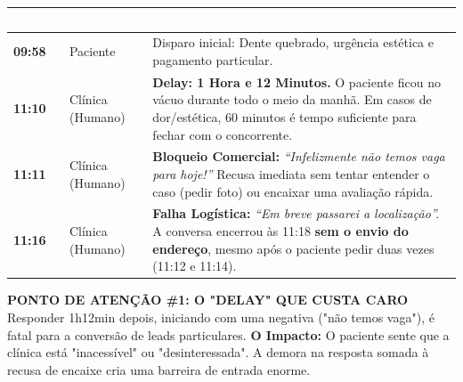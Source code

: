\documentclass[a4paper,11pt]{article}
\begin{document}
\begin{tcolorbox}[enhanced, frame hidden, colback=white]
    \renewcommand{\arraystretch}{1.5}
    \begin{tabular}{ | p{} | p{} | p{} | }
        \hline
        \rowcolor{infoDentalTeal}
        \textbf{\textcolor{white}{HORA}} & \textbf{\textcolor{white}{AGENTE}} & \textbf{\textcolor{white}{ANÁLISE DE FLUXO E TEMPO}} \\
        \hline
        \textbf{09:58} & Paciente &
        \small Disparo inicial: Dente quebrado, urgência estética e pagamento particular. \\
        \hline
        \textbf{11:10} & Clínica (Humano) &
        \textbf{\textcolor{infoDentalRed}{Delay: 1 Hora e 12 Minutos.}} \newline
        O paciente ficou no vácuo durante todo o meio da manhã. Em casos de dor/estética, 60 minutos é tempo suficiente para fechar com o concorrente. \\
        \hline
        \textbf{11:11} & Clínica (Humano) &
        \textbf{Bloqueio Comercial:} \textit{``Infelizmente não temos vaga para hoje!''} \newline
        Recusa imediata sem tentar entender o caso (pedir foto) ou encaixar uma avaliação rápida. \\
        \hline
        \textbf{11:16} & Clínica (Humano) &
        \textbf{Falha Logística:} \textit{``Em breve passarei a localização''.} \newline
        A conversa encerrou às 11:18 \textbf{sem o envio do endereço}, mesmo após o paciente pedir duas vezes (11:12 e 11:14). \\
        \hline
    \end{tabular}
\end{tcolorbox}

\begin{tcolorbox}[colback=infoDentalOrange!5, colframe=infoDentalOrange, boxrule=0.5pt, arc=0mm, left=2mm, right=2mm]
    \textbf{\textcolor{infoDentalOrange}{PONTO DE ATENÇÃO \#1: O "DELAY" QUE CUSTA CARO}}
    \footnotesize
    Responder 1h12min depois, iniciando com uma negativa ("não temos vaga"), é fatal para a conversão de leads particulares.
    \textbf{O Impacto:} O paciente sente que a clínica está "inacessível" ou "desinteressada". A demora na resposta somada à recusa de encaixe cria uma barreira de entrada enorme.
\end{tcolorbox}
\end{document}
